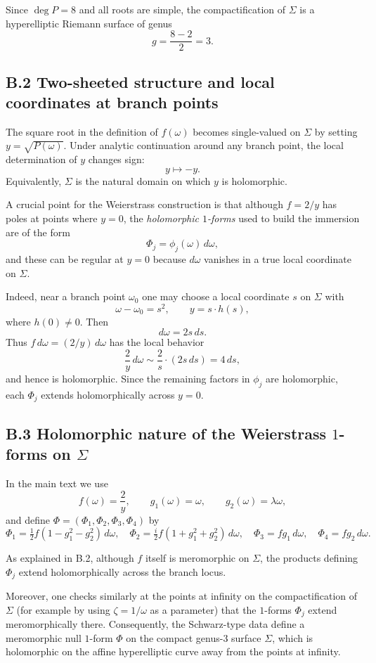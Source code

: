 \documentclass[12pt]{article}
\numberwithin{equation}{section}
\theoremstyle{definition}
\theoremstyle{remark}
\begin{document}
Since $\deg P=8$ and all roots are simple, the compactification of $\Sigma$ is a hyperelliptic
Riemann surface of genus
\[
g=\frac{8-2}{2}=3.
\]

\subsection*{B.2 Two-sheeted structure and local coordinates at branch points}

The square root in the definition of $f(\omega)$ becomes single-valued on $\Sigma$ by setting
$y=\sqrt{P(\omega)}$. Under analytic continuation around any branch point, the local determination
of $y$ changes sign:
\[
y\longmapsto -y.
\]
Equivalently, $\Sigma$ is the natural domain on which $y$ is holomorphic.

A crucial point for the Weierstrass construction is that although $f=2/y$ has poles at points where $y=0$,
the \emph{holomorphic $1$-forms} used to build the immersion are of the form
\[
\Phi_j=\phi_j(\omega)\,d\omega,
\]
and these can be regular at $y=0$ because $d\omega$ vanishes in a true local coordinate on $\Sigma$.

Indeed, near a branch point $\omega_0$ one may choose a local coordinate $s$ on $\Sigma$ with
\[
\omega-\omega_0 = s^2,\qquad y = s\cdot h(s),
\]
where $h(0)\neq 0$. Then
\[
d\omega = 2s\,ds.
\]
Thus $f\,d\omega = (2/y)\,d\omega$ has the local behavior
\[
\frac{2}{y}\,d\omega \sim \frac{2}{s}\cdot (2s\,ds)=4\,ds,
\]
and hence is holomorphic. Since the remaining factors in $\phi_j$ are holomorphic, each $\Phi_j$ extends holomorphically across $y=0$.

\subsection*{B.3 Holomorphic nature of the Weierstrass $1$-forms on $\Sigma$}

In the main text we use
\[
f(\omega)=\frac{2}{y},\qquad g_1(\omega)=\omega,\qquad g_2(\omega)=\lambda\omega,
\]
and define $\Phi=(\Phi_1,\Phi_2,\Phi_3,\Phi_4)$ by
\[
\Phi_1=\tfrac12 f(1-g_1^2-g_2^2)\,d\omega,\quad
\Phi_2=\tfrac{i}{2}f(1+g_1^2+g_2^2)\,d\omega,\quad
\Phi_3=fg_1\,d\omega,\quad
\Phi_4=fg_2\,d\omega.
\]

As explained in B.2, although $f$ itself is meromorphic on $\Sigma$, the products defining $\Phi_j$
extend holomorphically across the branch locus.

Moreover, one checks similarly at the points at infinity on the compactification of $\Sigma$
(for example by using $\zeta=1/\omega$ as a parameter) that the $1$-forms $\Phi_j$ extend meromorphically there.
Consequently, the Schwarz-type data define a meromorphic null $1$-form $\Phi$ on the compact genus-$3$ surface $\Sigma$, which is holomorphic on the affine hyperelliptic curve away from the points at infinity.
\end{document}
